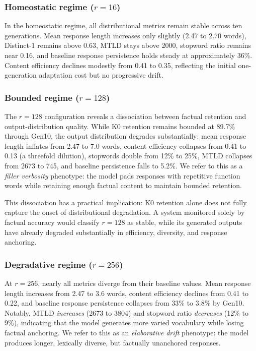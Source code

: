 \documentclass[a4paper,fleqn]{cas-dc}
\begin{document}
\subsubsection{Homeostatic regime ($r=16$)}
In the homeostatic regime, all distributional metrics remain stable across ten
generations. Mean response length increases only slightly (2.47 to 2.70 words),
Distinct-1 remains above 0.63, MTLD stays above 2000, stopword ratio remains
near 0.16, and baseline response persistence holds steady at approximately 36\%.
Content efficiency declines modestly from 0.41 to 0.35, reflecting the initial
one-generation adaptation cost but no progressive drift.

\subsubsection{Bounded regime ($r=128$)}\label{sec:dissociation}
The $r=128$ configuration reveals a dissociation between factual retention and
output-distribution quality. While K0 retention remains bounded at 89.7\% through
Gen10, the output distribution degrades substantially: mean response length
inflates from 2.47 to 7.0 words, content efficiency collapses from 0.41 to 0.13
(a threefold dilution), stopwords double from 12\% to 25\%, MTLD collapses from
2673 to 745, and baseline persistence falls to 5.2\%. We refer to this as a
\textit{filler verbosity} phenotype: the model pads responses with repetitive
function words while retaining enough factual content to maintain bounded
retention.

This dissociation has a practical implication: K0 retention alone does not fully
capture the onset of distributional degradation. A system monitored solely by
factual accuracy would classify $r=128$ as stable, while its generated outputs
have already degraded substantially in efficiency, diversity, and response
anchoring.

\subsubsection{Degradative regime ($r=256$)}
At $r=256$, nearly all metrics diverge from their baseline values. Mean response
length increases from 2.47 to 3.6 words, content efficiency declines from 0.41
to 0.22, and baseline response persistence collapses from 33\% to 3.8\% by
Gen10. Notably, MTLD \textit{increases} (2673 to 3804) and stopword ratio
\textit{decreases} (12\% to 9\%), indicating that the model generates more
varied vocabulary while losing factual anchoring. We refer to this as an
\textit{elaborative drift} phenotype: the model produces longer, lexically
diverse, but factually unanchored responses.
\end{document}

